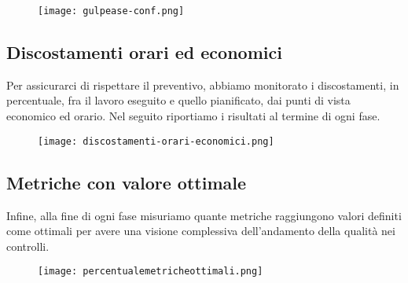\documentclass[../piano-di-qualifica.tex]{subfiles}
\begin{document}


\begin{figure}[H]
  \centering
  \texttt{[image: gulpease-conf.png]}%
\end{figure}

\newpage

\subsection{Discostamenti orari ed economici}%
\label{sub:discostamenti_orari_ed_economici}
Per assicurarci di rispettare il preventivo, abbiamo monitorato i discostamenti, in percentuale, fra il lavoro eseguito e quello pianificato, dai punti di vista economico ed orario. Nel seguito riportiamo i risultati al termine di ogni fase.

\begin{figure}[H]
  \centering
  \texttt{[image: discostamenti-orari-economici.png]}%
\end{figure}

\subsection{Metriche con valore ottimale}%
\label{sub:metriche_ottimali}
Infine, alla fine di ogni fase misuriamo quante metriche raggiungono valori definiti come ottimali per avere una visione complessiva dell'andamento della qualità nei controlli.
\begin{figure}[H]
  \centering
  \texttt{[image: percentualemetricheottimali.png]}%
\end{figure}
\end{document}
